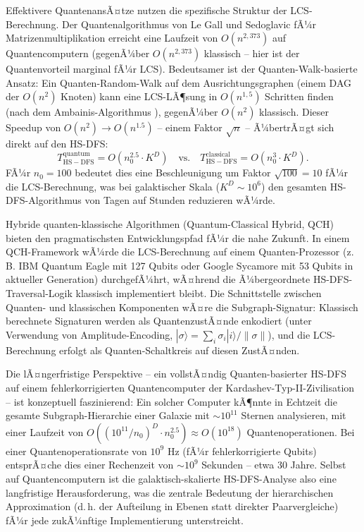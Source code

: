 ﻿\documentclass[a4paper,12pt]{report}
\theoremstyle{definition}
\begin{document}
Effektivere QuantenansÃ¤tze nutzen die spezifische Struktur der LCS-Berechnung. Der Quantenalgorithmus von Le Gall und Sedoglavic \cite{legall2014} fÃ¼r Matrizenmultiplikation erreicht eine Laufzeit von $O(n^{2{,}373})$ auf Quantencomputern (gegenÃ¼ber $O(n^{2{,}373})$ klassisch -- hier ist der Quantenvorteil marginal fÃ¼r LCS). Bedeutsamer ist der Quanten-Walk-basierte Ansatz: Ein Quanten-Random-Walk auf dem Ausrichtungsgraphen (einem DAG der $O(n^2)$ Knoten) kann eine LCS-LÃ¶sung in $O(n^{1{,}5})$ Schritten finden (nach dem Ambainis-Algorithmus \cite{ambainis2004}), gegenÃ¼ber $O(n^2)$ klassisch. Dieser Speedup von $O(n^2) \to O(n^{1.5})$ -- einem Faktor $\sqrt{n}$ -- Ã¼bertrÃ¤gt sich direkt auf den HS-DFS:
\[
T_\mathrm{HS-DFS}^{\mathrm{quantum}} = O\!\left(n_0^{2.5} \cdot K^D\right) \quad \text{vs.} \quad T_\mathrm{HS-DFS}^{\mathrm{classical}} = O\!\left(n_0^3 \cdot K^D\right).
\]
FÃ¼r $n_0 = 100$ bedeutet dies eine Beschleunigung um Faktor $\sqrt{100} = 10$ fÃ¼r die LCS-Berechnung, was bei galaktischer Skala ($K^D \sim 10^6$) den gesamten HS-DFS-Algorithmus von Tagen auf Stunden reduzieren wÃ¼rde.

Hybride quanten-klassische Algorithmen (Quantum-Classical Hybrid, QCH) bieten den pragmatischsten Entwicklungspfad fÃ¼r die nahe Zukunft. In einem QCH-Framework wÃ¼rde die LCS-Berechnung auf einem Quanten-Prozessor (z.\,B. IBM Quantum Eagle mit 127 Qubits oder Google Sycamore mit 53 Qubits in aktueller Generation) durchgefÃ¼hrt, wÃ¤hrend die Ã¼bergeordnete HS-DFS-Traversal-Logik klassisch implementiert bleibt. Die Schnittstelle zwischen Quanten- und klassischen Komponenten wÃ¤re die Subgraph-Signatur: Klassisch berechnete Signaturen werden als QuantenzustÃ¤nde enkodiert (unter Verwendung von Amplitude-Encoding, $|\sigma\rangle = \sum_i \sigma_i |i\rangle / \|\sigma\|$), und die LCS-Berechnung erfolgt als Quanten-Schaltkreis auf diesen ZustÃ¤nden.

Die lÃ¤ngerfristige Perspektive -- ein vollstÃ¤ndig Quanten-basierter HS-DFS auf einem fehlerkorrigierten Quantencomputer der Kardashev-Typ-II-Zivilisation -- ist konzeptuell faszinierend: Ein solcher Computer kÃ¶nnte in Echtzeit die gesamte Subgraph-Hierarchie einer Galaxie mit $\sim 10^{11}$ Sternen analysieren, mit einer Laufzeit von $O((10^{11}/n_0)^D \cdot n_0^{2.5}) \approx O(10^{18})$ Quantenoperationen. Bei einer Quantenoperationsrate von $10^9$ Hz (fÃ¼r fehlerkorrigierte Qubits) entsprÃ¤che dies einer Rechenzeit von $\sim 10^9$ Sekunden -- etwa 30 Jahre. Selbst auf Quantencomputern ist die galaktisch-skalierte HS-DFS-Analyse also eine langfristige Herausforderung, was die zentrale Bedeutung der hierarchischen Approximation (d.\,h. der Aufteilung in Ebenen statt direkter Paarvergleiche) fÃ¼r jede zukÃ¼nftige Implementierung unterstreicht.
\end{document}
